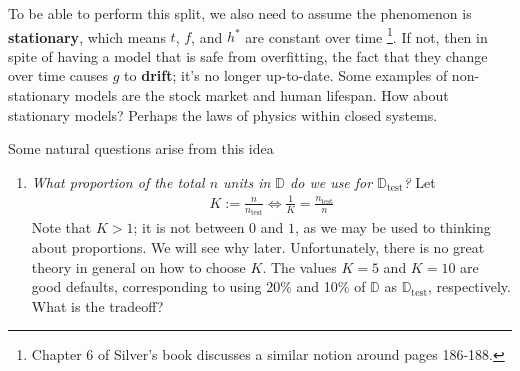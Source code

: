\documentclass[12pt, a4paper]{article}
\theoremstyle{definition}
\begin{document}
	To be able to perform this split, we also need to assume the phenomenon is
	\textbf{stationary}, which means $t$, $f$, and $h^*$ are constant over time
	\footnote{Chapter 6 of Silver's book discusses a similar notion around pages 186-188.}.
	If not, then in spite of having a model that is safe from overfitting, the fact
	that they change over time causes $g$ to \textbf{drift}; it's no longer up-to-date.
	Some examples of non-stationary models are the stock market and human lifespan.
	How about stationary models? Perhaps the laws of physics within closed systems.
	
	Some natural questions arise from this idea
	\begin{enumerate}[label=(\arabic*)]
		\item \textit{What proportion of the total $n$ units in $\mathbb{D}$ do
		we use for $\mathbb{D}_{\text{test}}$?} Let
		\begin{align*}
			K:=\frac{n}{n_{\text{test}}} \iff \frac{1}{K} = \frac{n_{\text{test}}}{n}
		\end{align*}
		Note that $K>1$; it is not between $0$ and $1$, as we may be used to thinking
		about proportions. We will see why later. Unfortunately, there is no great
		theory in general on how to choose $K$. The values $K=5$ and $K=10$ are good defaults,
		corresponding to using 20\% and 10\% of $\mathbb{D}$ as $\mathbb{D}_{\text{test}}$,
		respectively. What is the tradeoff?
		

\end{enumerate}
\end{document}
